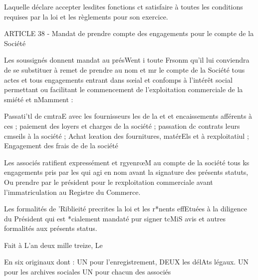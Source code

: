 \documentclass{article}
\begin{document}
Laquelle déclare accepter lesdites fonctions ct satisfaire à toutes les conditions requises par la loi et les règlements pour son exercice.

ARTICLE 38 - Mandat de prendre compte des engagements pour le compte de la Société

Les soussignés donnent mandat au présWent i toute Frsonm qu'il lui conviendra de se substituer à remet de prendre au nom et mr le compte de la Société tous actes et tous engagements entrant dans sœial et confomps à l'intérêt social permettant ou facilitant le commencement de l'exploitation commerciale de la smiété et nMamment :

Passati'tl de cmtraE avec les fournisseurs les de la et et encaissements afférents à ces ;
paiement des loyers et charges de la société ;
passation dc contrats leurs cmseils à la société ;
Achat lœation des fournitures, matérEls et à rexploitatiul ;
Engagement des frais de de la société

Les associés ratifient expressément et rgyenrœM au compte de la société tous ks engagements pris par les qui agi en nom avant la signature des présents statuts, Ou prendre par le président pour le rexploitation commerciale avant l'immatriculation au Registre du Commerce.

Les formalités de 'Riblieité precrites la loi et les r*nents effEtuées à la diligence du Président qui est *cialement mandaté pur signer tcMiS avis et autres formalités aux présents status.

Fait à
L'an deux mille treize,
Le

En six originaux dont :
UN pour l'enregistrement,
DEUX les délAts légaux.
UN pour les archives sociales
UN pour chacun des associés
\end{document}
